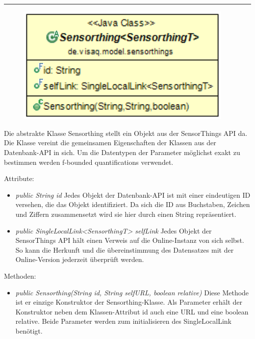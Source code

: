 \rule{\textwidth}{0.4pt}
\begin{minipage}{0.4\textwidth}
    \begin{figure}[H]
        {\centering\includegraphics[width=0.95\textwidth]{media/backend/modell/classes/Sensorthing.png}}
    \end{figure}
    \end{minipage} \hfill
    \begin{minipage}{0.6\textwidth}
Die abstrakte Klasse Sensorthing stellt ein Objekt aus der \gls{SensorThings API} da.
Die Klasse vereint die gemeinsamen Eigenschaften der Klassen aus der Datenbank-\gls{API} in sich.
Um die Datentypen der Parameter möglichst exakt zu bestimmen werden \glspl{f-bounded quantification} verwendet.
\end{minipage}

Attribute:
\begin{itemize}
    \item \emph{public String id} Jedes Objekt der Datenbank-\gls{API} ist mit einer eindeutigen ID versehen, die das Objekt identifiziert.
    Da sich die ID aus Buchstaben, Zeichen und Ziffern zusammensetzt wird sie hier durch einen String repräsentiert.
    \item \emph{public SingleLocalLink<SensorthingT> selfLink} Jedes Objekt der \gls{SensorThings API} hält einen Verweis auf die Online-Instanz von sich selbst.
    So kann die Herkunft und die übereinstimmung des Datensatzes mit der Online-Version jederzeit überprüft werden.
\end{itemize}
Methoden: \begin{itemize}
    \item \emph{public Sensorthing(String id, String selfURL, boolean relative)} Diese Methode ist er einzige Konstruktor der Sensorthing-Klasse.
    Als Parameter erhält der Konstruktor neben dem Klassen-Attribut id auch eine URL und eine boolean relative. Beide Parameter werden zum initialisieren des SingleLocalLink benötigt.
\end{itemize}

